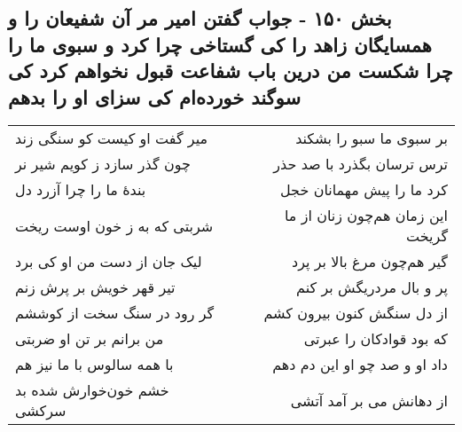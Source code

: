 \begin{center}
\section*{بخش ۱۵۰ - جواب گفتن امیر مر آن شفیعان را و همسایگان زاهد را کی گستاخی چرا کرد و سبوی ما را چرا شکست من درین باب شفاعت قبول نخواهم کرد کی سوگند خورده‌ام کی سزای او را بدهم}
\label{sec:sh150}
\begin{longtable}{l p{0.5cm} r}
میر گفت او کیست کو سنگی زند
&&
بر سبوی ما سبو را بشکند
\\
چون گذر سازد ز کویم شیر نر
&&
ترس ترسان بگذرد با صد حذر
\\
بندهٔ ما را چرا آزرد دل
&&
کرد ما را پیش مهمانان خجل
\\
شربتی که به ز خون اوست ریخت
&&
این زمان هم‌چون زنان از ما گریخت
\\
لیک جان از دست من او کی برد
&&
گیر هم‌چون مرغ بالا بر پرد
\\
تیر قهر خویش بر پرش زنم
&&
پر و بال مردریگش بر کنم
\\
گر رود در سنگ سخت از کوششم
&&
از دل سنگش کنون بیرون کشم
\\
من برانم بر تن او ضربتی
&&
که بود قوادکان را عبرتی
\\
با همه سالوس با ما نیز هم
&&
داد او و صد چو او این دم دهم
\\
خشم خون‌خوارش شده بد سرکشی
&&
از دهانش می بر آمد آتشی
\\
\end{longtable}
\end{center}
